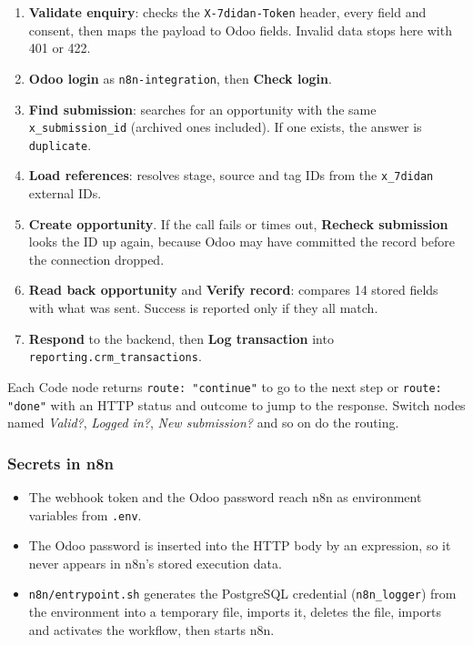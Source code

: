 \documentclass[11pt,a4paper]{article}
\newcommand{\f}[1]{\texttt{#1}}
\begin{document}
\begin{enumerate}
  \item \textbf{Validate enquiry}: checks the \f{X-7didan-Token} header, every field and consent,
        then maps the payload to Odoo fields. Invalid data stops here with 401 or 422.
  \item \textbf{Odoo login} as \f{n8n-integration}, then \textbf{Check login}.
  \item \textbf{Find submission}: searches for an opportunity with the same \f{x\_submission\_id}
        (archived ones included). If one exists, the answer is \f{duplicate}.
  \item \textbf{Load references}: resolves stage, source and tag IDs from the \f{x\_7didan} external IDs.
  \item \textbf{Create opportunity}. If the call fails or times out, \textbf{Recheck submission} looks the
        ID up again, because Odoo may have committed the record before the connection dropped.
  \item \textbf{Read back opportunity} and \textbf{Verify record}: compares 14 stored fields with what was
        sent. Success is reported only if they all match.
  \item \textbf{Respond} to the backend, then \textbf{Log transaction} into \f{reporting.crm\_transactions}.
\end{enumerate}

Each Code node returns \f{route: "continue"} to go to the next step or \f{route: "done"} with an HTTP
status and outcome to jump to the response. Switch nodes named \emph{Valid?}, \emph{Logged in?},
\emph{New submission?} and so on do the routing.

\subsubsection*{Secrets in n8n}
\begin{itemize}
  \item The webhook token and the Odoo password reach n8n as environment variables from \f{.env}.
  \item The Odoo password is inserted into the HTTP body by an expression, so it never appears in
        n8n's stored execution data.
  \item \f{n8n/entrypoint.sh} generates the PostgreSQL credential (\f{n8n\_logger}) from the
        environment into a temporary file, imports it, deletes the file, imports and activates the
        workflow, then starts n8n.
\end{itemize}
\end{document}
